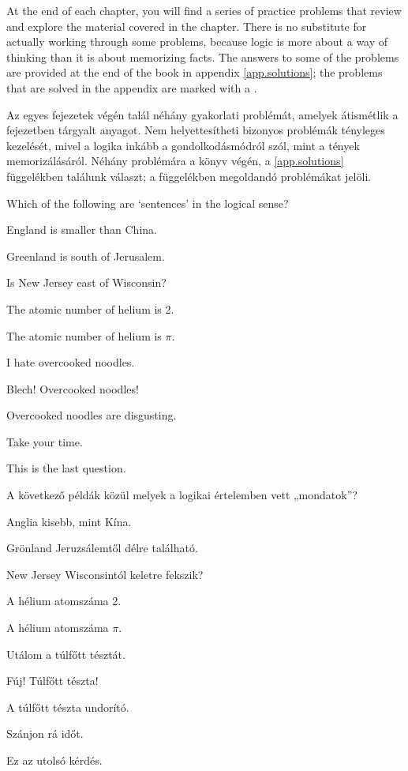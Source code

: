 
\practiceproblems
At the end of each chapter, you will find a series of practice problems that review and explore the material covered in the chapter. There is no substitute for actually working through some problems, because logic is more about a way of thinking than it is about memorizing facts. The answers to some of the problems are provided at the end of the book in appendix \ref{app.solutions}; the problems that are solved in the appendix are marked with a \solutions.

\practiceproblems
Az egyes fejezetek végén talál néhány gyakorlati problémát, amelyek átismétlik a fejezetben tárgyalt anyagot. Nem helyettesítheti bizonyos problémák tényleges kezelését, mivel a logika inkább a gondolkodásmódról szól, mint a tények memorizálásáról. Néhány problémára a könyv végén, a \ref{app.solutions} függelékben találunk választ; a függelékben megoldandó problémákat \solutions jelöli.

\problempart
Which of the following are `sentences' in the logical sense?
\begin{earg}
\item England is smaller than China.
\item Greenland is south of Jerusalem.
\item Is New Jersey east of Wisconsin?
\item The atomic number of helium is 2.
\item The atomic number of helium is $\pi$.
\item I hate overcooked noodles.
\item Blech! Overcooked noodles!
\item Overcooked noodles are disgusting.
\item Take your time.
\item This is the last question.
\end{earg}

\problempart
A következő példák közül melyek a logikai értelemben vett „mondatok”?
\begin{earg}
\item Anglia kisebb, mint Kína.
\item Grönland Jeruzsálemtől délre található.
\item New Jersey Wisconsintól keletre fekszik?
\item A hélium atomszáma 2.
\item A hélium atomszáma $\pi$.
\item Utálom a túlfőtt tésztát.
\item Fúj! Túlfőtt tészta!
\item A túlfőtt tészta undorító.
\item Szánjon rá időt.
\item Ez az utolsó kérdés.
\end{earg}

